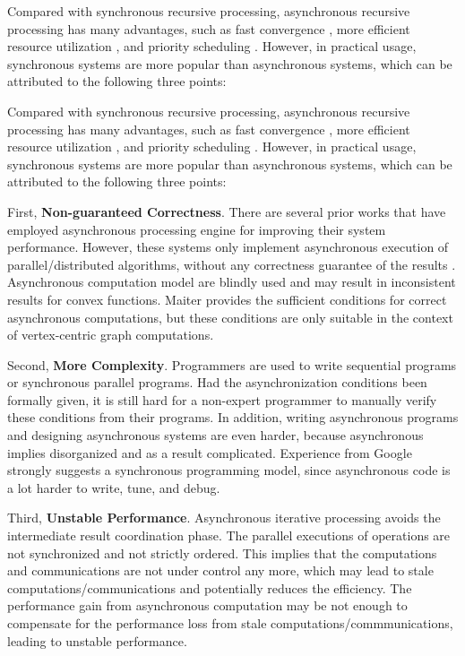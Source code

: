Compared with synchronous recursive processing, asynchronous recursive processing has many advantages, such as fast convergence \cite{}, more efficient resource utilization \cite{}, and priority scheduling \cite{}. However, in practical usage, synchronous systems are more popular than asynchronous systems, which can be attributed to the following three points:

Compared with synchronous recursive processing, asynchronous recursive processing has many advantages, such as fast convergence \cite{}, more efficient resource utilization \cite{}, and priority scheduling \cite{}. However, in practical usage, synchronous systems are more popular than asynchronous systems, which can be attributed to the following three points:

First, \textbf{Non-guaranteed Correctness}. There are several prior works that have employed asynchronous processing engine for improving their system performance. However, these systems only implement asynchronous execution of parallel/distributed algorithms, without any correctness guarantee of the results \cite{}. Asynchronous computation model are blindly used and may result in inconsistent results for convex functions. Maiter \cite{} provides the sufficient conditions for correct asynchronous computations, but these conditions are only suitable in the context of vertex-centric graph computations.

Second, \textbf{More Complexity}. Programmers are used to write sequential programs or synchronous parallel programs. Had the asynchronization conditions been formally given, it is still hard for a non-expert programmer to manually verify these conditions from their programs. In addition, writing asynchronous programs and designing asynchronous systems are even harder, because asynchronous implies disorganized and as a result complicated. Experience from Google \cite{} strongly suggests a synchronous programming model, since asynchronous code is a lot harder to write, tune, and debug.

{\color{red}
Third, \textbf{Unstable Performance}. Asynchronous iterative processing avoids the intermediate result coordination phase. The parallel executions of operations are not synchronized and not strictly ordered. This implies that the computations and communications are not under control any more, which may lead to stale computations/communications and potentially reduces the efficiency. The performance gain from asynchronous computation may be not enough to compensate for the performance loss from stale computations/commmunications, leading to unstable performance.
}

